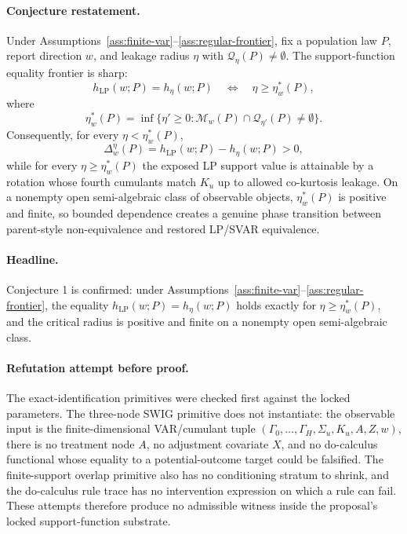 \begin{theorem}\label{thm:critical-leakage-frontier}
\paragraph{Conjecture restatement.}
Under Assumptions~\ref{ass:finite-var}--\ref{ass:regular-frontier}, fix a population law \(P\), report direction \(w\), and leakage radius \(\eta\) with \(\mathcal Q_\eta(P)\ne\emptyset\).  The support-function equality frontier is sharp:
\[
h_{\mathrm{LP}}(w;P)=h_\eta(w;P)
\quad\Longleftrightarrow\quad
\eta\ge \eta_w^*(P),
\]
where
\[
\eta_w^*(P)=
\inf\{\eta'\ge0:\mathcal M_w(P)\cap\mathcal Q_{\eta'}(P)\ne\emptyset\}.
\]
Consequently, for every \(\eta<\eta_w^*(P)\),
\[
\Delta_w^\eta(P)=h_{\mathrm{LP}}(w;P)-h_\eta(w;P)>0,
\]
while for every \(\eta\ge\eta_w^*(P)\) the exposed LP support value is attainable by a rotation whose fourth cumulants match \(K_u\) up to allowed co-kurtosis leakage.  On a nonempty open semi-algebraic class of observable objects, \(\eta_w^*(P)\) is positive and finite, so bounded dependence creates a genuine phase transition between parent-style non-equivalence and restored LP/SVAR equivalence.

\paragraph{Headline.}
Conjecture 1 is confirmed: under Assumptions~\ref{ass:finite-var}--\ref{ass:regular-frontier}, the equality \(h_{\mathrm{LP}}(w;P)=h_\eta(w;P)\) holds exactly for \(\eta\ge\eta_w^*(P)\), and the critical radius is positive and finite on a nonempty open semi-algebraic class.
\end{theorem}

\paragraph{Refutation attempt before proof.}
The exact-identification primitives were checked first against the locked parameters.  The three-node SWIG primitive does not instantiate: the observable input is the finite-dimensional VAR/cumulant tuple \((\Gamma_0,\ldots,\Gamma_H,\Sigma_u,K_u,A,Z,w)\), there is no treatment node \(A\), no adjustment covariate \(X\), and no do-calculus functional whose equality to a potential-outcome target could be falsified.  The finite-support overlap primitive also has no conditioning stratum to shrink, and the do-calculus rule trace has no intervention expression on which a rule can fail.  These attempts therefore produce no admissible witness inside the proposal's locked support-function substrate.

